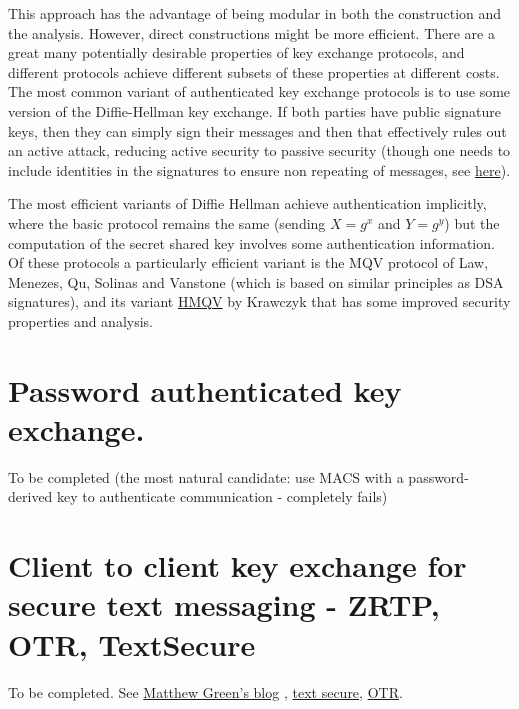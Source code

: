 This approach has the advantage of being modular in both the
construction and the analysis. However, direct constructions might be
more efficient. There are a great many potentially desirable properties
of key exchange protocols, and different protocols achieve different
subsets of these properties at different costs. The most common variant
of authenticated key exchange protocols is to use some version of the
Diffie-Hellman key exchange. If both parties have public signature keys,
then they can simply sign their messages and then that effectively rules
out an active attack, reducing active security to passive security
(though one needs to include identities in the signatures to ensure non
repeating of messages, see
\href{http://link.springer.com/article/10.1007\%2FBF00124891}{here}).

The most efficient variants of Diffie Hellman achieve authentication
implicitly, where the basic protocol remains the same (sending \(X=g^x\)
and \(Y=g^y\)) but the computation of the secret shared key involves
some authentication information. Of these protocols a particularly
efficient variant is the MQV protocol of Law, Menezes, Qu, Solinas and
Vanstone (which is based on similar principles as DSA signatures), and
its variant \href{https://eprint.iacr.org/2005/176.pdf}{HMQV} by
Krawczyk that has some improved security properties and analysis.

\section{Password authenticated key
exchange.}\label{14-Password-authenticated}

To be completed (the most natural candidate: use MACS with a
password-derived key to authenticate communication - completely fails)


\section{Client to client key exchange for secure text messaging - ZRTP,
OTR, TextSecure}\label{14-Client-to-client-key-e}

To be completed. See
\href{http://blog.cryptographyengineering.com/2013/03/here-come-encryption-apps.html}{Matthew
Green's blog} ,
\href{https://whispersystems.org/blog/advanced-ratcheting/}{text
secure}, \href{https://otr.cypherpunks.ca/Protocol-v3-4.0.0.html}{OTR}.

